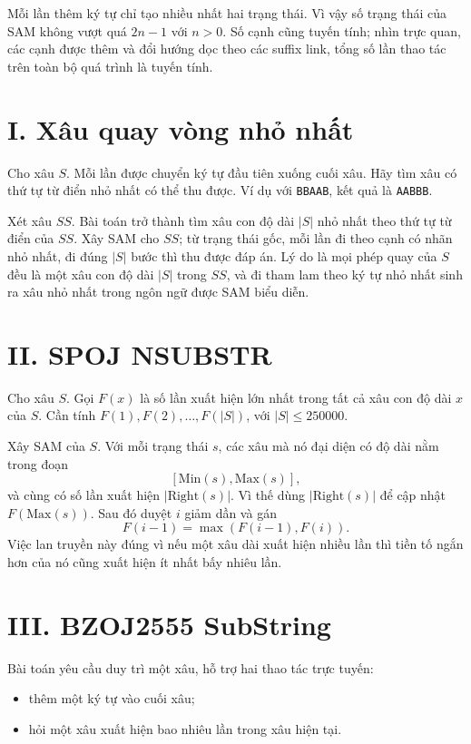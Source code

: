 \documentclass[11pt]{article}
\begin{document}
Mỗi lần thêm ký tự chỉ tạo nhiều nhất hai trạng thái.  Vì vậy số trạng thái của
SAM không vượt quá $2n-1$ với $n>0$.  Số cạnh cũng tuyến tính; nhìn trực quan,
các cạnh được thêm và đổi hướng dọc theo các suffix link, tổng số lần thao tác
trên toàn bộ quá trình là tuyến tính.

\section{I. Xâu quay vòng nhỏ nhất}

Cho xâu $S$.  Mỗi lần được chuyển ký tự đầu tiên xuống cuối xâu.  Hãy tìm xâu
có thứ tự từ điển nhỏ nhất có thể thu được.  Ví dụ với \texttt{BBAAB}, kết quả
là \texttt{AABBB}.

Xét xâu $SS$.  Bài toán trở thành tìm xâu con độ dài $|S|$ nhỏ nhất theo thứ tự
từ điển của $SS$.  Xây SAM cho $SS$; từ trạng thái gốc, mỗi lần đi theo cạnh có
nhãn nhỏ nhất, đi đúng $|S|$ bước thì thu được đáp án.  Lý do là mọi phép quay
của $S$ đều là một xâu con độ dài $|S|$ trong $SS$, và đi tham lam theo ký tự
nhỏ nhất sinh ra xâu nhỏ nhất trong ngôn ngữ được SAM biểu diễn.

\section{II. SPOJ NSUBSTR}

Cho xâu $S$.  Gọi $F(x)$ là số lần xuất hiện lớn nhất trong tất cả xâu con độ
dài $x$ của $S$.  Cần tính $F(1),F(2),\ldots,F(|S|)$, với
$|S|\le 250000$.

Xây SAM của $S$.  Với mỗi trạng thái $s$, các xâu mà nó đại diện có độ dài nằm
trong đoạn
\[
  [\mathrm{Min}(s),\mathrm{Max}(s)],
\]
và cùng có số lần xuất hiện $|\mathrm{Right}(s)|$.  Vì thế dùng
$|\mathrm{Right}(s)|$ để cập nhật $F(\mathrm{Max}(s))$.  Sau đó duyệt $i$ giảm
dần và gán
\[
  F(i-1)=\max(F(i-1),F(i)).
\]
Việc lan truyền này đúng vì nếu một xâu dài xuất hiện nhiều lần thì tiền tố
ngắn hơn của nó cũng xuất hiện ít nhất bấy nhiêu lần.

\section{III. BZOJ2555 SubString}

Bài toán yêu cầu duy trì một xâu, hỗ trợ hai thao tác trực tuyến:
\begin{itemize}
  \item thêm một ký tự vào cuối xâu;
  \item hỏi một xâu xuất hiện bao nhiêu lần trong xâu hiện tại.
\end{itemize}
\end{document}
